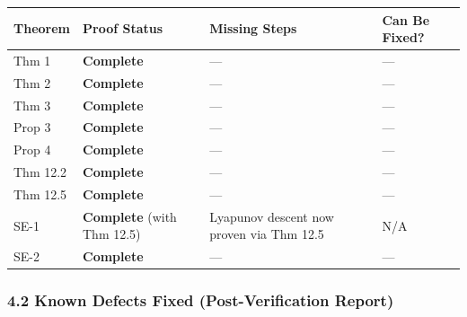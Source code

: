 \documentclass[
  12pt,
]{ctexart}
\begin{document}
\begin{longtable}[]{@{}
  >{\raggedright\arraybackslash}p{}
  >{\raggedright\arraybackslash}p{}
  >{\raggedright\arraybackslash}p{}
  >{\raggedright\arraybackslash}p{}@{}}
\toprule\noalign{}
\begin{minipage}[b]{\linewidth}\raggedright
Theorem
\end{minipage} & \begin{minipage}[b]{\linewidth}\raggedright
Proof Status
\end{minipage} & \begin{minipage}[b]{\linewidth}\raggedright
Missing Steps
\end{minipage} & \begin{minipage}[b]{\linewidth}\raggedright
Can Be Fixed?
\end{minipage} \\
\midrule\noalign{}
\endhead
\bottomrule\noalign{}
\endlastfoot
Thm 1 & \textbf{Complete} & --- & --- \\
Thm 2 & \textbf{Complete} & --- & --- \\
Thm 3 & \textbf{Complete} & --- & --- \\
Prop 3 & \textbf{Complete} & --- & --- \\
Prop 4 & \textbf{Complete} & --- & --- \\
Thm 12.2 & \textbf{Complete} & --- & --- \\
Thm 12.5 & \textbf{Complete} & --- & --- \\
SE-1 & \textbf{Complete} (with Thm 12.5) & Lyapunov descent now proven
via Thm 12.5 & N/A \\
SE-2 & \textbf{Complete} & --- & --- \\
\end{longtable}

\subsubsection{4.2 Known Defects Fixed (Post-Verification
Report)}\label{known-defects-fixed-post-verification-report}
\end{document}
